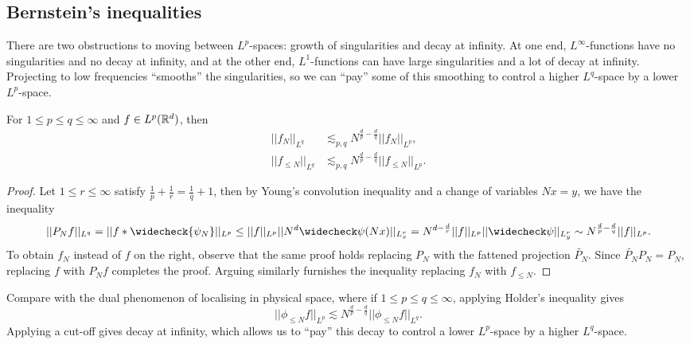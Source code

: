 \subsection{Bernstein's inequalities}

There are two obstructions to moving between $L^p$-spaces: growth of singularities and decay at infinity. At one end, $L^\infty$-functions have no singularities and no decay at infinity, and at the other end, $L^1$-functions can have large singularities and a lot of decay at infinity. Projecting to low frequencies ``smooths'' the singularities, so we can ``pay'' some of this smoothing to control a higher $L^q$-space by a lower $L^p$-space. 

\begin{proposition}\label{prop:bernstein}
	For $1 \leq p \leq q \leq \infty$ and $f \in L^p (\mathbb R^d)$, then 
	\begin{align*}
					||f_N||_{L^q} 
						&\lesssim_{p, q} N^{\frac{d}{p} - \frac{d}{q}} ||f_N||_{L^p}, \\
					||f_{\leq N}||_{L^q} 
						&\lesssim_{p, q} N^{\frac{d}{p} - \frac{d}{q}} ||f_{\leq N}||_{L^p}. 
				\end{align*}
\end{proposition}

\begin{proof}
	Let $1 \leq r \leq \infty$ satisfy $\tfrac1p + \tfrac1r = \tfrac1q + 1$, then by Young's convolution inequality and a change of variables $Nx = y$, we have the inequality
	\begin{align*}
		|| P_N f ||_{L^q} = || f * \widecheck{\psi_N} ||_{L^p} \leq ||f||_{L^p} ||N^d \widecheck \psi(Nx)||_{L^r_x} = N^{d - \frac{d}{r}} ||f||_{L^p} ||\widecheck \psi ||_{L^r_y} \sim N^{\frac{d}{p} - \frac{d}{q}} ||f||_{L^p}.
	\end{align*}
	To obtain $f_N$ instead of $f$ on the right, observe that the same proof holds replacing $P_N$ with the fattened projection $\widetilde{P_N}$. Since $\widetilde{P_N} P_N = P_N$, replacing $f$ with $P_N f$ completes the proof. Arguing similarly furnishes the inequality replacing $f_N$ with $f_{\leq N}$. 
\end{proof}

\begin{remark}
	Compare with the dual phenomenon of localising in physical space, where if $1 \leq p \leq q \leq \infty$, applying Holder's inequality gives
		\[ ||\phi_{\leq N} f||_{L^p} \lesssim N^{\frac{d}{p} - \frac{d}{q}} ||\phi_{\leq N} f||_{L^q}. \]
	Applying a cut-off gives decay at infinity, which allows us to ``pay'' this decay to control a lower $L^p$-space by a higher $L^q$-space. 	
\end{remark}

